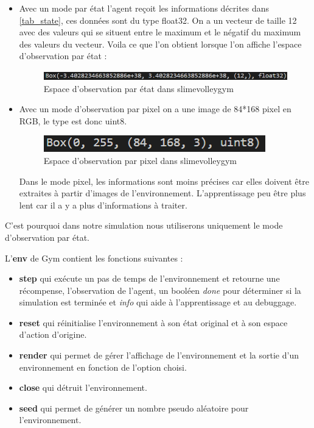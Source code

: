 \documentclass[11pt, a4paper]{article}
\begin{document}
	\begin{itemize}
		\item Avec un mode par état l'agent reçoit les informations décrites dans \ref{tab_state}, ces données sont du type float32. On a un vecteur de taille 12 avec des valeurs qui se situent entre le maximum et le négatif du maximum des valeurs du vecteur.
		Voila ce que l'on obtient lorsque l'on affiche l'espace d'observation par état :
		\begin{figure}[H]
			\centering
			\includegraphics[scale=0.5]{images/obs_spaceBox.PNG}
			\caption {Espace d'observation par état dans slimevolleygym}
		\end{figure}

		\item Avec un mode d'observation par pixel on a une image de 84*168 pixel en RGB, le type est donc uint8.
		\begin{figure}[H]
			\centering
			\includegraphics[scale=0.5]{images/obs_spaceBoxPixel.PNG}
			\caption {Espace d'observation par pixel dans slimevolleygym}
		\end{figure}
		Dans le mode pixel, les informations sont moins précises car elles doivent être extraites à partir d'images de l'environnement. L'apprentissage peu être plus lent car il a y a plus d'informations à traiter.
	\end{itemize}

	C'est pourquoi dans notre simulation nous utiliserons uniquement le mode d'observation par état.

	\vspace{0.5cm}

	L'\textbf{env} de Gym contient les fonctions suivantes : \cite{openaigymenv}
	\begin{itemize}
		\item  \textbf{step} qui exécute un pas de temps de l'environnement et retourne une récompense, l'observation de l'agent, un booléen \textit{done} pour déterminer si la simulation est terminée et \textit{info} qui aide à l'apprentissage et au debuggage.
		\item \textbf{reset} qui réinitialise l'environnement à son état original et à son espace d'action d'origine.
		\item \textbf{render} qui permet de gérer l'affichage de l'environnement et la sortie d'un environnement en fonction de l'option choisi.
		\item \textbf{close} qui détruit l'environnement.
		\item \textbf{seed} qui permet de générer un nombre pseudo aléatoire pour l'environnement.
	\end{itemize}
\end{document}
